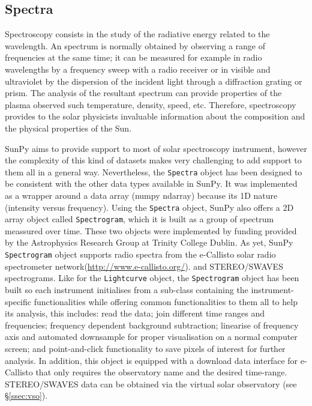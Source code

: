 \subsection{Spectra}\label{sec:spectra}

Spectroscopy consists in the study of the radiative energy related to the wavelength.
An spectrum is normally obtained by observing a range of frequencies at the same time; 
it can be measured for example in radio wavelengths by a frequency sweep with 
a radio receiver or in visible and ultraviolet by the dispersion of the incident light 
through a diffraction grating or prism.
The analysis of the resultant spectrum can provide properties of the plasma observed 
such temperature, density, speed, etc.
Therefore, spectroscopy provides to the solar physicists invaluable information about 
the composition and the physical properties of the Sun.  

SunPy aims to provide support to most of solar spectroscopy instrument, however the 
complexity of this kind of datasets makes very challenging to add support to them all 
in a general way.  
Nevertheless, the \texttt{Spectra} object has been designed to be consistent with the 
other data types available in SunPy.
It was implemented as a wrapper around a data array (numpy ndarray)
because its 1D nature (intensity versus frequency).
Using the \texttt{Spectra} object, SunPy also offers a 2D array object called \texttt{Spectrogram},
which it is built as a group of spectrum meassured over time.
These two objects were implemented by funding provided by the Astrophysics Research 
Group at Trinity College Dublin.
As yet, SunPy \texttt{Spectrogram} object supports radio spectra from the e-Callisto 
solar radio spectrometer network(\url{http://www.e-callisto.org/}).
and STEREO/SWAVES spectrograms.
Like for the \texttt{Lightcurve} object, the \texttt{Spectrogram} object has been
built so each instrument initialises from a sub-class containing the instrument-specific 
functionalities while offering common functionalities to them all to help its analysis, 
this includes:
read the data; %
join different time ranges and frequencies; 
frequency dependent background subtraction;  
linearise of frequency axis and automated downsample for proper visualisation on a normal computer screen;  
and point-and-click functionality to save pixels of interest for further analysis.
In addition, this object is equipped with a download data interface for e-Callisto that 
only requires the observatory name and the desired time-range. 
STEREO/SWAVES data can be obtained via the virtual solar observatory (see \S\ref{ssec:vso}).

